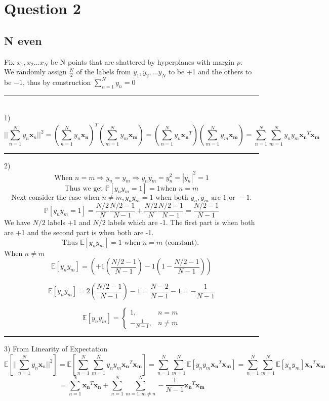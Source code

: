 \documentclass{article}
\begin{document}
\section*{Question 2}
\subsection*{N even}
Fix $x_1, x_2 \dots x_N$ be N points that are shattered by hyperplanes with margin $\rho$. 
\\
We randomly assign $\frac{N}{2}$ of the labels from $y_1, y_2, \dots y_N$ to be +1 and the others to be $-1$, thus by construction $ \sum_{n=1}^N y_n = 0$
\par\noindent\rule{\textwidth}{0.8pt}
\\
1) $$ || \sum_{n=1}^N y_n \bm{x}_n||^2 = (\sum_{n=1}^Ny_n \bm{x_n})^T(\sum_{m=1}^Ny_m\bm{x_m}) = (\sum_{n=1}^Ny_n \bm{x_n}^T)(\sum_{m=1}^Ny_m\bm{x_m}) = \sum_{n=1}^N\sum_{m=1}^N y_n y_m \bm{x_n}^T \bm{x_m} $$
\vspace{2mm}
\par\noindent\rule{\textwidth}{0.8pt}
2) $$ \text{When }  n = m \Rightarrow y_n = y_m \Rightarrow y_n y_m = y_n ^ 2 = |y_n|^2 = 1 $$
$$ \text{Thus we get } \mathbb{P}[y_n y_m=1] = 1 \text{when } n=m $$
$$ \text{Next consider the case when } n \neq m, y_n y_m = 1 \text{ when both } y_n, y_m \text{ are } 1 \text{ or } -1. $$
$$\mathbb{P}[y_n y_m = 1 ] = \frac{N/2}{N} \frac{N/2-1}{N-1} + \frac{N/2}{N} \frac{N/2-1}{N-1} = \frac{N/2-1}{N-1}$$
We have $N/2$ labels +1 and $N/2$ labels which are -1. The first part is when both are +1 and the second part is when both are -1.
$$ \text{Thus } \mathbb{E}[y_n y_m] = 1 \text{ when } n=m \text{ (constant). } $$
When $ n \neq m $
$$\mathbb{E}[y_n y_m] = (+1(\frac{N/2-1}{N-1}) -1 (1 -\frac{N/2-1}{N-1} ))$$

$$\mathbb{E}[y_n y_m] = 2(\frac{N/2-1}{N-1})-1 = \frac{N-2}{N-1}-1 = -\frac{1}{N-1}$$

\[
    \mathbb{E}[y_n y_m] = 
\begin{cases}
    1,& n = m \\
    -\frac{1}{N-1}, & n \neq m 
\end{cases}
\]
\vspace{2mm}
\par\noindent\rule{\textwidth}{0.8pt}
3) 
From Linearity of Expectation
$$\mathbb{E}[|| \sum_{n=1}^N y_n \bm{x}_n||^2] = \mathbb{E}[\sum_{n=1}^N\sum_{m=1}^N y_n y_m \bm{x_n}^T \bm{x_m}] = \sum_{n=1}^N\sum_{m=1}^N \mathbb{E}[ y_n y_m \bm{x_n}^T \bm{x_m}] = \sum_{n=1}^N\sum_{m=1}^N \mathbb{E}[ y_n y_m] \bm{x_n}^T \bm{x_m} $$
$$ = \sum_{n=1}^N \bm{x_n}^T \bm{x_n} + \sum_{n=1}^N\sum_{m=1, m\neq n}^N -\frac{1}{N-1} \bm{x_n}^T \bm{x_m} $$
\end{document}

